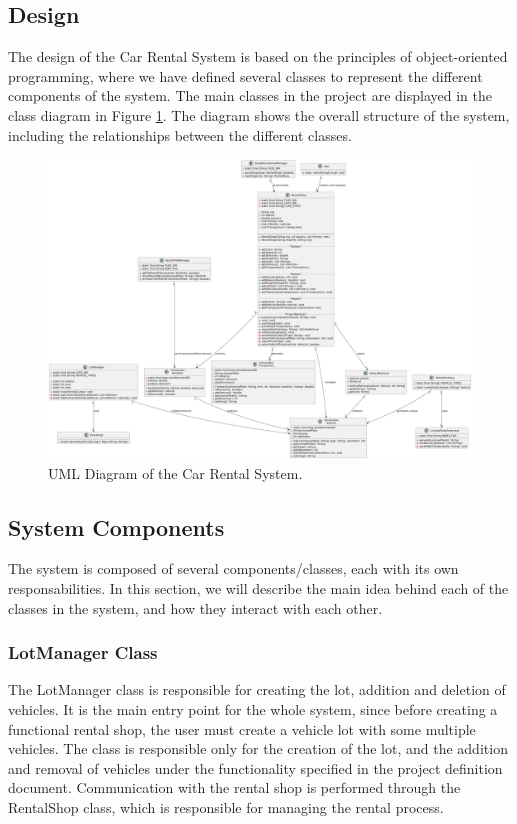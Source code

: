 \documentclass[conference]{IEEEtran}
\begin{document}
\subsection{Design}
The design of the Car Rental System is based on the principles of object-oriented programming, where we have defined several classes to represent the different components of the system. The main classes in the project are displayed in the class diagram in Figure \ref{fig:uml_diagram}. The diagram shows the overall structure of the system, including the relationships between the different classes.

\begin{figure}
    \centering
    \includegraphics[width=\textwidth]{Diagram/ClassDiagram.png}
    \caption{\centering UML Diagram of the Car Rental System.}
    \label{fig:uml_diagram}
\end{figure}

\subsection{System Components}
The system is composed of several components/classes, each with its own responsabilities. In this section, we will describe the main idea behind each of the classes in the system, and how they interact with each other. 

\subsubsection{LotManager Class}
The LotManager class is responsible for creating the lot, addition and deletion of vehicles. It is the main entry point for the whole system, since before creating a functional rental shop, the user must create a vehicle lot with some multiple vehicles. The class is responsible only for the creation of the lot, and the addition and removal of vehicles under the functionality specified in the project definition document. Communication with the rental shop is performed through the RentalShop class, which is responsible for managing the rental process. 
\end{document}
